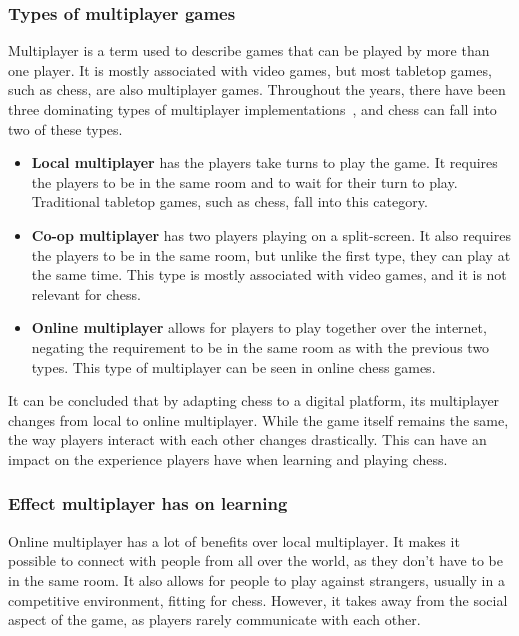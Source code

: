 \subsubsection{Types of multiplayer games}

Multiplayer is a term used to describe games that can be played by more than one player.
It is mostly associated with video games, but most tabletop games, such as chess, are also multiplayer games.
Throughout the years, there have been three dominating types of multiplayer implementations~\cite{multiplayer-types},
and chess can fall into two of these types.

\begin{itemize}

    \item \textbf{Local multiplayer} has the players take turns to play the game.
    It requires the players to be in the same room and to wait for their turn to play.
    Traditional tabletop games, such as chess, fall into this category.

    \item \textbf{Co-op multiplayer} has two players playing on a split-screen.
    It also requires the players to be in the same room, but unlike the first type, they can play at the same time.
    This type is mostly associated with video games, and it is not relevant for chess.

    \item \textbf{Online multiplayer} allows for players to play together over the internet, negating the requirement to
    be in the same room as with the previous two types.
    This type of multiplayer can be seen in online chess games.

\end{itemize}

It can be concluded that by adapting chess to a digital platform, its multiplayer changes from local to online
multiplayer.
While the game itself remains the same, the way players interact with each other changes drastically.
This can have an impact on the experience players have when learning and playing chess.

\subsubsection{Effect multiplayer has on learning}

Online multiplayer has a lot of benefits over local multiplayer.
It makes it possible to connect with people from all over the world, as they don't have to be in the same room.
It also allows for people to play against strangers, usually in a competitive environment, fitting for chess.
However, it takes away from the social aspect of the game, as players rarely communicate with each other.


